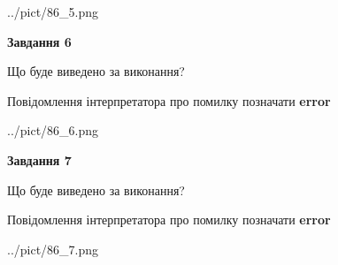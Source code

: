 \documentclass[10pt, ukrainian]{article}
\begin{document}
{\begin {large}
\begin{center}
	{../pict/86_5.png}
\end{center}
\newpage

{\begin {center}\textbf{Завдання 6}\end {center}}\par
Що буде виведено за виконання? \par
Повідомлення інтерпретатора про помилку позначати \textbf{error}

\begin{center}
	{../pict/86_6.png}
\end{center}
\newpage

{\begin {center}\textbf{Завдання 7}\end {center}}\par
Що буде виведено за виконання? \par
Повідомлення інтерпретатора про помилку позначати \textbf{error}

\begin{center}
	{../pict/86_7.png}
\end{center}
\newpage

\end {large}}
\end{document}
